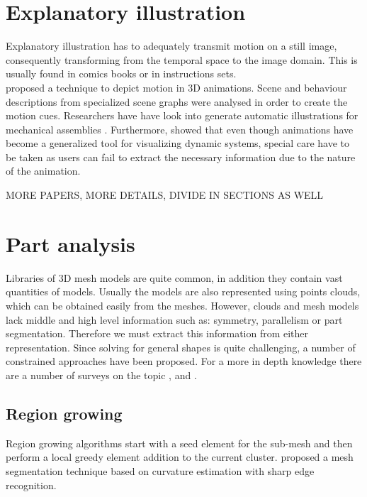 \section{Explanatory illustration}

Explanatory illustration has to adequately transmit motion on a still image, consequently transforming from the temporal space to the image domain.
This is usually found in comics books or in instructions sets.\\

\cite{Nienhaus2005} proposed a technique to depict motion in 3D animations.
Scene and behaviour descriptions from specialized scene graphs were analysed in order to create the motion cues.  
Researchers have have look into generate automatic illustrations for mechanical assemblies \cite{Mitra2010}.
Furthermore, \cite{Lowe2014} showed that even though animations have become a generalized tool for visualizing dynamic systems, special care have to be taken as users can fail to extract the necessary information due to the nature of the animation.

MORE PAPERS, MORE DETAILS, DIVIDE IN SECTIONS AS WELL

\section{Part analysis}

Libraries of 3D mesh models are quite common, in addition they contain vast quantities of models.   
Usually the models are also represented using points clouds, which can be obtained easily from the meshes.
However, clouds and mesh models lack middle and high level information such as: symmetry, parallelism or part segmentation.
Therefore we must extract this information from either representation.
Since solving for general shapes is quite challenging, a number of constrained approaches have been proposed.
For a more in depth knowledge there are a number of surveys on the topic \cite{Varady1997}, \cite{Agathos2007} and \cite{Shamir2008}.\\

\subsection{Region growing}

Region growing algorithms start with a seed element for the sub-mesh and then perform a local greedy element addition to the current cluster.
\cite{Mizoguchi2006} proposed a mesh segmentation technique based on curvature estimation with sharp edge recognition.

